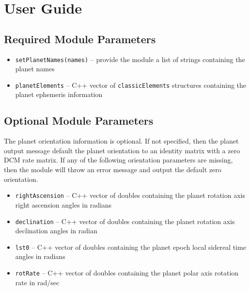 
\section{User Guide}
\subsection{Required Module Parameters}
\begin{itemize}
	\item {\tt setPlanetNames(names)} --  provide the module a list of strings containing the planet names
	\item {\tt planetElements} --  C++ vector of {\tt classicElements} structures containing the planet ephemeris information
\end{itemize}


\subsection{Optional Module Parameters}
The planet orientation information is optional.  If not specified, then the planet output message default the planet orientation to an identity matrix with a zero DCM rate matrix.  If any of the following orientation parameters are missing, then the module will throw an error message and output the default zero orientation.

\begin{itemize}
	\item {\tt rightAscension} --  C++ vector of doubles containing the planet rotation axis right ascension angles in radians
	\item {\tt declination} --  C++ vector of doubles containing the planet rotation axis declination angles in radian
	\item {\tt lst0} --  C++ vector of doubles containing the planet epoch local sidereal time angles in radians
	\item {\tt rotRate} --  C++ vector of doubles containing the planet polar axis rotation rate in rad/sec
\end{itemize}
